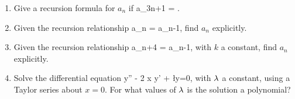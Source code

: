 \documentclass[12pt]{book}
\begin{document}
\begin{enumerate}
%
%

  \item
    Give a recursion formula for $a_n$ if
    \bee
    a_{3n+1} = .
    \eee

  \item
    Given the recursion relationship
    \bee
    a_n = a_{n-1},
    \eee
    find $a_n$ explicitly.

  \item
    Given the recursion relationship
    \bee
    a_{n+4} =  a_{n-1},
    \eee
    with $k$ a constant, find $a_n$ explicitly.

  \item Solve the differential equation
    \bee
    y'' - 2 x y' + \l y=0,
    \eee
    with $\lambda$ a constant, using a Taylor series about $x=0$. For what values
    of $\lambda$ is the solution a polynomial?

\end{enumerate}
\end{document}
